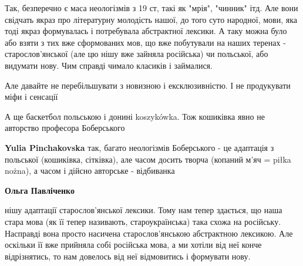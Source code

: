 \begin{itemize}
Так, безперечно є маса неологізмів з 19 ст, такі як "мрія", "чинник" ітд. Але
вони свідчать якраз про літературну молодість нашої, до того суто народної,
мови, яка тоді якраз формувалась і потребувала абстрактної лексики. А таку
можна було або взяти з тих вже сформованих мов, що вже побутували на наших
теренах - старослов'янської (але цю нішу вже зайняла російська) чи польської,
або видумати нову. Чим справді чимало класиків і займалися.

Але давайте не перебільшувати з новизною і ексклюзивністю. І не продукувати
міфи і сенсації \Smiley[1.0][yellow]

\begin{itemize}
 
А ще баскетбол польською і донині koszykówka. Тож кошиківка явно не авторство професора Боберського \Laughey[1.0][white]\Laughey[1.0][white]

 
\textbf{Yulia Pinchakovska} так, багато неологізмів Боберського - це адаптація з польської (кошиківка, сітківка), але часом досить творча (копаний м'яч = piłka nożna), а часом і дійсно авторське - відбиванка

 
\textbf{Ольга Павліченко} 

нішу адаптації старослов'янської лексики. Тому нам тепер здається, що наша
стара мова (як її тепер називають, староукраїнська) така схожа на російську.
Насправді вона просто насичена старослов'янською абстрактною лексикою. Але
оскільки її вже прийняла собі російська мова, а ми хотіли від неї конче
відрізнятись, то нам довелось від неї відмовитись і формувати нову.


 

\end{itemize}
\end{itemize}
